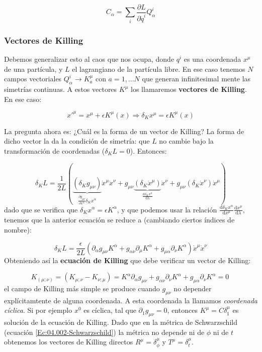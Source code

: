\documentclass[12pt,a4paper]{book}
\numberwithin{equation}{section}
\numberwithin{figure}{section}
\newcommand{\parentesis}[1]{\left( #1  \right)}
\newcommand{\parciales}[2]{\frac{\partial #1}{\partial #2}}
\newcommand{\D}{\mathrm{d}}
\newcommand{\derivadas}[2]{\frac{\D #1}{\D #2}}
\begin{document}
\begin{equation}
C_\alpha = \sum_i \parciales{L}{\dot{q}^i} Q_\alpha^i
\end{equation}

\subsubsection{Vectores de Killing}
Debemos generalizar esto al caos que nos ocupa, donde $q^i$ es una coordenada $x^\mu$ de una partícula, y $L$ el lagrangiano de la partícula libre. En ese caso tenemos $N$ campos vectoriales $Q_\alpha^i \rightarrow K_a^\mu$ con $a=1,...N$ que generan infinitesimal mente las simetrías continuas. A estos vectores $K^\mu$ los llamaremos \textbf{vectores de Killing}. En ese caso:

\begin{equation}
x'^\mu = x^\mu + \epsilon K^\mu (x) \Rightarrow \delta_K x^\mu = \epsilon K^\mu (x)
\end{equation}

La pregunta ahora es: ¿Cuál es la forma de un vector de Killing? La forma de dicho vector la da la condición de simetría: que $L$ no cambie bajo la transformación de coordenadas ($\delta_K L=0$). Entonces:

\begin{equation}
\delta_K L = \frac{1}{2L} \parentesis{ \underbrace{(\delta_K g_{\mu \nu})}_{\parciales{g_{\mu \nu}}{x^\alpha}\delta_K x^\alpha} \dot{x}^\mu \dot{x}^\nu + g_{\mu \nu} \underbrace{(\delta_K \dot{x}^\mu)}_{\derivadas{\delta_K x^\mu}{\lambda}} \dot{x}^\nu  + g_{\mu \nu} (\delta_K \dot{x}^\nu) \dot{x}^\mu  } 
\end{equation}
dado que se verifica que $\delta_K x^\alpha = \epsilon K^\alpha$, y que podemos usar la relación $\derivadas{\delta_K x^\alpha}{x^\mu}\derivadas{x^\mu}{\lambda}$, tenemos que la anterior ecuación se reduce a (cambiando ciertos índices de nombre): 

\begin{equation}
\delta_K L = \frac{\epsilon}{2L} \parentesis{\partial_\alpha g_{\mu \nu} K^\alpha + g_{\alpha \nu} \partial_\mu K^\alpha + g_{\mu \alpha} \partial_\nu K^\alpha} \dot{x}^\mu \dot{x}^\nu
\end{equation}
Obteniendo así la \textbf{ecuación de Killing} que debe verificar un vector de Killing:

\begin{equation}
K_{(\mu ;\nu)} = \parentesis{K_{\mu;\nu} - K_{\nu;\mu}} = K^\alpha \partial_\alpha g_{\mu \nu} + g_{\alpha \nu} \partial_\nu K^\alpha + g_{\mu \alpha} \partial_\nu K^\alpha = 0 \ \label{Ec:04.010-Killing}
\end{equation}
el campo de Killing más simple se produce cuando $g_{\mu \nu}$ no depender explícitamtente de alguna coordenada. A esta coordenada la llamamos \textit{coordenada cíclica}. Si por ejemplo $x^0$ es cíclica, tal que $\partial_1 g_{\mu \nu}= 0$, entonces $K^\mu = C \delta ^\mu_1$ es solución de la ecuación de Killing.  Dado que en la métrica de Schwarzschild (ecuación \ref{Ec:04.002-Schwarzschild}) la métrica no depende ni de $\phi$ ni de $t$ obtenemos los vectores de Killing directos  $R^\mu = \delta^\mu_\phi$ y  $T^\mu = \delta^\mu_t$.
\end{document}
